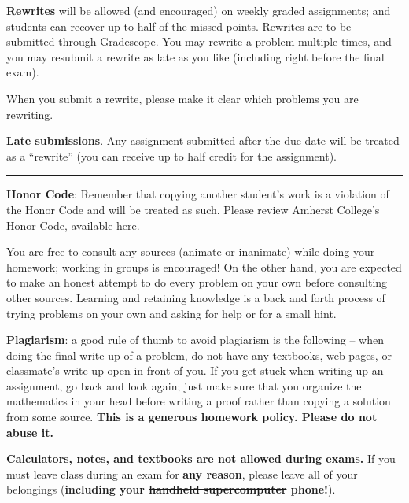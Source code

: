 \documentclass[12pt]{article}
\begin{document}
\noindent\textbf{Rewrites} will be allowed (and encouraged) on weekly graded assignments;
 and students can recover up to half of the missed points. Rewrites
 are to be submitted through Gradescope. You may rewrite a problem
 multiple times, and you may resubmit a rewrite as late as you like
 (including right before the final exam).

\medskip

\noindent When you submit a rewrite, please make it clear which problems you are rewriting.

\bigskip
\noindent\textbf{Late submissions}. Any assignment submitted after the due date will be treated as a ``rewrite'' (you can receive up to half credit for the assignment).

\smallskip \hrule \medskip

\noindent\textbf{Honor Code}: Remember that copying another student's work is a violation of the Honor Code and will be treated as such. Please review Amherst College's Honor Code, available \href{https://www.amherst.edu/offices/student-affairs/community-standards/college-standards/honor-code}{here}.

You are free to consult any sources (animate or inanimate) while doing your homework; working in groups is encouraged! %
On the other hand, you are expected to make an honest attempt to do every problem on your own before consulting other sources. Learning and retaining knowledge is a back and forth process of trying problems on your own and asking for help or for a small hint.

\bigskip
\noindent\textbf{Plagiarism}: a good rule of thumb to avoid plagiarism is the following -- when doing the final write up of a problem, do not have any textbooks, web pages, or classmate's write up open in front of you. If you get stuck when writing up an assignment, go back and look again; just make sure that you organize the mathematics in your head before writing a proof rather than copying a solution from some source. \textbf{This is a generous homework policy. Please do not abuse it.}

\bigskip
\noindent \textbf{Calculators, notes, and textbooks are not allowed during exams.}
 If you must leave class during an exam for \textbf{any reason}, please leave all of your belongings (\textbf{including your \sout{handheld supercomputer} phone!}).
\end{document}
